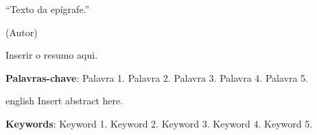 \documentclass[
    12pt,
    twoside,
    a4paper,
    chapter=TITLE,
    section=TITLE,
    english,
    brazil
]{abntex2}
\begin{document}
\begin{epigrafe}
    \vspace*{\fill}
    \begin{citacao}
        ``Texto da epígrafe.'' \par (Autor)
    \end{citacao}
\end{epigrafe}

\setlength{\absparsep}{18pt}
\begin{resumo}
Inserir o resumo aqui.

\textbf{Palavras-chave}: Palavra 1. Palavra 2. Palavra 3. Palavra 4. Palavra 5.
\end{resumo}

\begin{resumo}[Abstract]
\begin{otherlanguage*}{english}
Insert abstract here.

\textbf{Keywords}: Keyword 1. Keyword 2. Keyword 3. Keyword 4. Keyword 5.
\end{otherlanguage*}
\end{resumo}

\listoffigures*
\cleardoublepage

\listoftables*
\cleardoublepage

\tableofcontents*
\cleardoublepage

\textual











\postextual


\end{document}
